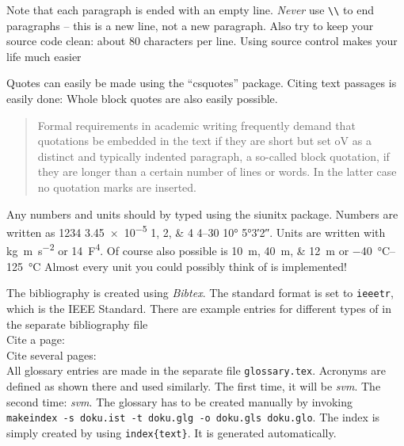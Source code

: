%
Note that each paragraph is ended with an empty line.
\emph{Never} use \verb|\\| to end paragraphs -- this is a new line, not a new paragraph.
Also try to keep your source code clean: about 80 characters per line.
Using source control makes your life much easier

%
Quotes can easily be made using the \enquote{csquotes} package.
Citing text passages is easily done:  Whole block quotes are also easily
possible.

\blockquote{Formal requirements in academic writing frequently demand that
    quotations be embedded in the text if they are short but set oV as a distinct
    and typically indented paragraph, a so-called block quotation, if they are
    longer than a certain number of lines or words. In the latter case no quotation
    marks are inserted.}

%
Any numbers and units should by typed using the siunitx package.
Numbers are written as \num{1234} \num{3.45e-5} \numlist{1;2;4} \numrange{4}{30} \ang{10} \ang{5;3;2}.
Units are written with \si{\kilo\gram\meter\per\square\second} or \SI{14}{\farad\tothe{4}}.
Of course also possible is \SIlist{10;40;12}{\meter} or \SIrange{-40}{+125}{\degreeCelsius}
Almost every unit you could possibly think of is implemented!

%
The bibliography is created using \emph{Bibtex}. The
standard format is set to \texttt{ieeetr}, which is the IEEE Standard. There
are example entries for different types of  in the separate bibliography file
\cite{incollection} \cite{manual} \\


Cite a page: \cite[p. 435]{incollection} \\
Cite several pages: \cite[pp. 436-440]{incollection}\\

%
All glossary entries are made in the separate file \texttt{glossary.tex}.
Acronyms are defined as shown there and used similarly.
The first time, it will be \emph{\gls{svm}}.
The second time: \emph{\gls{svm}}.
The glossary has to be created manually by invoking \texttt{makeindex -s doku.ist -t doku.glg -o doku.gls doku.glo}.
The index is simply created by using \texttt{index\{text\}}. It is generated automatically.

